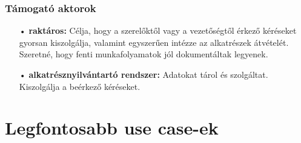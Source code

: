 \documentclass[12pt]{article}\usepackage[left=20mm,right=20mm,top=15mm,bottom=20mm]{geometry}
\begin{document}
\subsubsection{Támogató aktorok}
\begin{itemize}
\item[•] \textbf{raktáros: } Célja, hogy a szerelőktől vagy a vezetőségtől érkező kéréseket gyorsan kiszolgálja, valamint egyszerűen intézze az alkatrészek átvételét.
Szeretné, hogy fenti munkafolyamatok jól dokumentáltak legyenek.

\item[•] \textbf{alkatrésznyilvántartó rendszer: } Adatokat tárol és szolgáltat. Kiszolgálja a beérkező kéréseket.
\end{itemize}

\section{Legfontosabb use case-ek}
\end{document}
